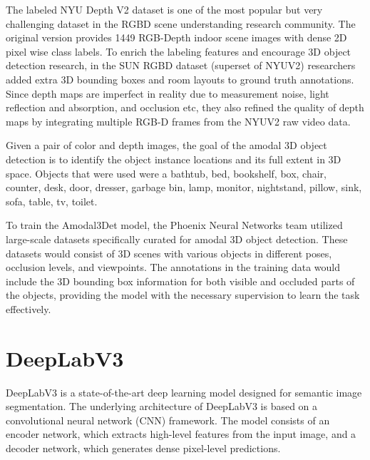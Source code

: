 The labeled NYU Depth V2 \cite{Silberman:ECCV12} dataset is one of the most popular but very challenging dataset in the RGBD scene understanding research community. The original version provides 1449 RGB-Depth indoor scene images with dense 2D pixel wise class labels. To enrich the labeling features and encourage 3D object detection research, in the SUN RGBD dataset \cite{sunrgbd} (superset of NYUV2) researchers added extra 3D bounding boxes and room layouts to ground truth annotations. Since depth maps are imperfect in reality due to measurement noise, light reflection and absorption, and occlusion etc, they also refined the quality of depth maps by integrating multiple RGB-D frames from the NYUV2 raw video data.

Given a pair of color and depth images, the goal of the amodal 3D object detection is to identify the object instance locations and its full extent in 3D space. Objects that were used were a bathtub, bed, bookshelf, box, chair, counter, desk, door, dresser, garbage bin, lamp, monitor, nightstand, pillow, sink, sofa, table, tv, toilet. 

To train the Amodal3Det model, the Phoenix Neural Networks team utilized large-scale datasets specifically curated for amodal 3D object detection. These datasets would consist of 3D scenes with various objects in different poses, occlusion levels, and viewpoints. The annotations in the training data would include the 3D bounding box information for both visible and occluded parts of the objects, providing the model with the necessary supervision to learn the task effectively.



\section{DeepLabV3}
DeepLabV3 \cite{deeplabv3plus2018, chen2017rethinking} is a state-of-the-art deep learning model designed for semantic image segmentation. The underlying architecture of DeepLabV3 is based on a convolutional neural network (CNN) framework. The model consists of an encoder network, which extracts high-level features from the input image, and a decoder network, which generates dense pixel-level predictions.

